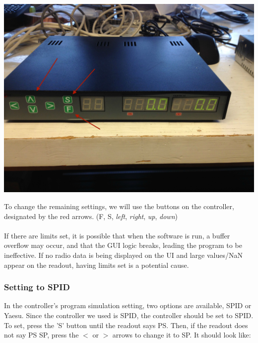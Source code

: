 \documentclass[11pt]{article} %
\begin{document}
\begin{center}
\includegraphics[scale=0.10]{controller/01.jpeg}
\end{center}

To change the remaining settings, we will use the buttons on the controller, designated by the red arrows. (F, S, \emph{left}, \emph{right}, \emph{up}, \emph{down})
\\ \\
If there are limits set, it is possible that when the software is run, a buffer overflow may occur, and that the GUI logic breaks, leading the program to be ineffective. If no radio data is being displayed on the UI and large values/NaN appear on the readout, having limits set is a potential cause.

\subsubsection{Setting to SPID}

In the controller's program simulation setting, two options are available, SPID or Yaesu. Since the controller we used is SPID, the controller should be set to SPID. To set, press the 'S' button until the readout says PS. Then, if the readout does not say PS SP, press the $<$ or $>$ arrows to change it to SP. It should look like:
\end{document}
